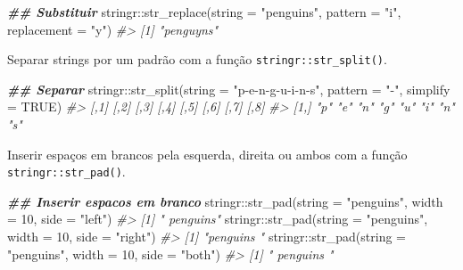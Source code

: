 \documentclass[
]{book}
\newenvironment{Shaded}{\begin{snugshade}}{\end{snugshade}}
\newcommand{\AttributeTok}[1]{\textcolor[rgb]{0.61,0.61,0.61}{#1}}
\newcommand{\CommentTok}[1]{\textcolor[rgb]{0.37,0.37,0.37}{\textit{#1}}}
\newcommand{\ConstantTok}[1]{\textcolor[rgb]{0,0,0}{#1}}
\newcommand{\DecValTok}[1]{\textcolor[rgb]{0.06,0.06,0.06}{#1}}
\newcommand{\DocumentationTok}[1]{\textcolor[rgb]{0.37,0.37,0.37}{\textbf{\textit{#1}}}}
\newcommand{\FunctionTok}[1]{\textcolor[rgb]{0,0,0}{#1}}
\newcommand{\NormalTok}[1]{#1}
\newcommand{\SpecialCharTok}[1]{\textcolor[rgb]{0,0,0}{#1}}
\newcommand{\StringTok}[1]{\textcolor[rgb]{0.5,0.5,0.5}{#1}}
\begin{document}
\begin{Shaded}
\begin{Highlighting}[]
\DocumentationTok{\#\# Substituir}
\NormalTok{stringr}\SpecialCharTok{::}\FunctionTok{str\_replace}\NormalTok{(}\AttributeTok{string =} \StringTok{"penguins"}\NormalTok{, }\AttributeTok{pattern =} \StringTok{"i"}\NormalTok{, }\AttributeTok{replacement =} \StringTok{"y"}\NormalTok{)}
\CommentTok{\#\textgreater{} [1] "penguyns"}
\end{Highlighting}
\end{Shaded}

Separar strings por um padrão com a função \texttt{stringr::str\_split()}.

\begin{Shaded}
\begin{Highlighting}[]
\DocumentationTok{\#\# Separar}
\NormalTok{stringr}\SpecialCharTok{::}\FunctionTok{str\_split}\NormalTok{(}\AttributeTok{string =} \StringTok{"p{-}e{-}n{-}g{-}u{-}i{-}n{-}s"}\NormalTok{, }\AttributeTok{pattern =} \StringTok{"{-}"}\NormalTok{, }\AttributeTok{simplify =} \ConstantTok{TRUE}\NormalTok{)}
\CommentTok{\#\textgreater{}      [,1] [,2] [,3] [,4] [,5] [,6] [,7] [,8]}
\CommentTok{\#\textgreater{} [1,] "p"  "e"  "n"  "g"  "u"  "i"  "n"  "s"}
\end{Highlighting}
\end{Shaded}

Inserir espaços em brancos pela esquerda, direita ou ambos com a função \texttt{stringr::str\_pad()}.

\begin{Shaded}
\begin{Highlighting}[]
\DocumentationTok{\#\# Inserir espacos em branco}
\NormalTok{stringr}\SpecialCharTok{::}\FunctionTok{str\_pad}\NormalTok{(}\AttributeTok{string =} \StringTok{"penguins"}\NormalTok{, }\AttributeTok{width =} \DecValTok{10}\NormalTok{, }\AttributeTok{side =} \StringTok{"left"}\NormalTok{)}
\CommentTok{\#\textgreater{} [1] "  penguins"}
\NormalTok{stringr}\SpecialCharTok{::}\FunctionTok{str\_pad}\NormalTok{(}\AttributeTok{string =} \StringTok{"penguins"}\NormalTok{, }\AttributeTok{width =} \DecValTok{10}\NormalTok{, }\AttributeTok{side =} \StringTok{"right"}\NormalTok{)}
\CommentTok{\#\textgreater{} [1] "penguins  "}
\NormalTok{stringr}\SpecialCharTok{::}\FunctionTok{str\_pad}\NormalTok{(}\AttributeTok{string =} \StringTok{"penguins"}\NormalTok{, }\AttributeTok{width =} \DecValTok{10}\NormalTok{, }\AttributeTok{side =} \StringTok{"both"}\NormalTok{)}
\CommentTok{\#\textgreater{} [1] " penguins "}
\end{Highlighting}
\end{Shaded}
\end{document}
